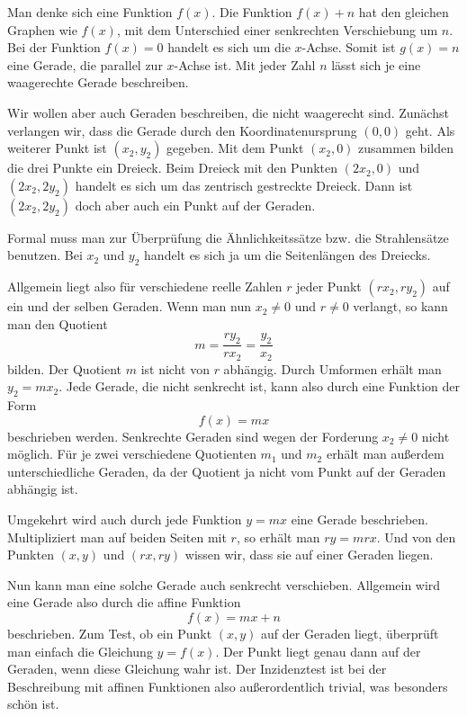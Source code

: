 \documentclass[a4paper,11pt,fleqn,twocolumn,twoside,dvipdfmx]{scrartcl}
\begin{document}
Man denke sich eine Funktion $f(x)$. Die Funktion $f(x)+n$ hat
den gleichen Graphen wie $f(x)$, mit dem Unterschied einer
senkrechten Verschiebung um $n$. Bei der Funktion $f(x)=0$
handelt es sich um die $x$-Achse. Somit ist $g(x)=n$ eine
Gerade, die parallel zur $x$-Achse ist. Mit jeder Zahl $n$ lässt
sich je eine waagerechte Gerade beschreiben.

Wir wollen aber auch Geraden beschreiben, die nicht waagerecht sind.
Zunächst verlangen wir, dass die Gerade durch den Koordinatenursprung $(0,0)$
geht. Als weiterer Punkt ist $(x_2,y_2)$ gegeben. Mit dem Punkt
$(x_2,0)$ zusammen bilden die drei Punkte ein Dreieck. Beim Dreieck
mit den Punkten $(2x_2,0)$ und $(2x_2,2y_2)$ handelt es sich
um das zentrisch gestreckte Dreieck. Dann ist $(2x_2,2y_2)$ doch
aber auch ein Punkt auf der Geraden.

Formal muss man zur Überprüfung die Ähnlichkeitssätze bzw. die
Strahlensätze benutzen. Bei $x_2$ und $y_2$ handelt es sich ja
um die Seitenlängen des Dreiecks.

Allgemein liegt also für verschiedene reelle Zahlen $r$
jeder Punkt $(rx_2,ry_2)$ auf ein und der selben Geraden.
Wenn man nun $x_2\ne 0$ und $r\ne 0$ verlangt, so kann man
den Quotient
\begin{equation}
m = \frac{ry_2}{rx_2} = \frac{y_2}{x_2}
\end{equation}
bilden. Der Quotient $m$ ist nicht von $r$ abhängig.
Durch Umformen erhält man $y_2=mx_2$. Jede Gerade, die nicht
senkrecht ist, kann also durch eine Funktion der Form
\begin{equation}
f(x)=mx
\end{equation}
beschrieben werden. Senkrechte Geraden sind wegen der Forderung
$x_2\ne 0$ nicht möglich. Für je zwei verschiedene Quotienten
$m_1$ und $m_2$ erhält man außerdem unterschiedliche Geraden,
da der Quotient ja nicht vom Punkt auf der Geraden abhängig ist.

Umgekehrt wird auch durch jede
Funktion $y=mx$ eine Gerade beschrieben. Multipliziert man auf
beiden Seiten mit $r$, so erhält man $ry=mrx$. Und von den Punkten
$(x,y)$ und $(rx,ry)$ wissen wir, dass sie auf einer Geraden liegen.

Nun kann man eine solche Gerade auch senkrecht verschieben. Allgemein
wird eine Gerade also durch die affine Funktion
\begin{equation}
f(x) = mx+n
\end{equation}
beschrieben. Zum Test, ob ein Punkt $(x,y)$ auf der Geraden liegt,
überprüft man einfach die Gleichung $y=f(x)$. Der Punkt liegt
genau dann auf der Geraden, wenn diese Gleichung wahr ist. Der
Inzidenztest ist bei der Beschreibung mit affinen Funktionen also
außerordentlich trivial, was besonders schön ist.
\end{document}
